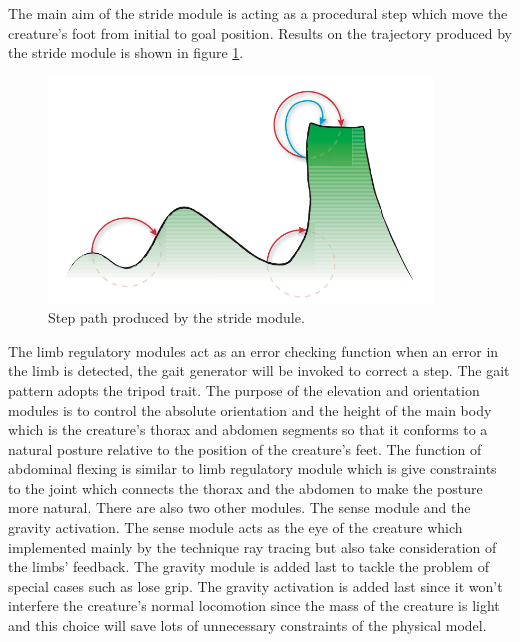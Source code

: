The main aim of the stride module is acting as a procedural step which move the creature's foot from initial to goal position. Results on the trajectory produced by the stride module is shown in figure \ref{fig:stride}.
\begin{figure}[ht!]
\centering
\includegraphics[height=6cm]{figures/stride.png}
\caption{Step path produced by the stride module. \protect\cite{thesis}}
\label{fig:stride}
\end{figure}
The limb regulatory modules act as an error checking function when an error in the limb is detected, the
gait generator will be invoked to correct a step. The gait pattern adopts the tripod trait. 
The purpose of the elevation and orientation modules is to control the absolute
orientation and the height of the main body which is the creature's
thorax and abdomen segments so that it conforms to a natural posture
relative to the position of the creature's feet. The function of abdominal flexing
is similar to limb regulatory module which is give constraints to the
joint which connects the thorax and the abdomen to make the posture
more natural. 
There are also two other modules. The sense module and the gravity activation.
The sense module acts as the eye of the creature which implemented mainly by the technique ray tracing but also take consideration of the limbs' feedback. The gravity module is added last to tackle the problem of special cases such as lose grip. The gravity activation is added last since it won't interfere the creature's normal locomotion since the mass of the creature is light and this choice will save lots of unnecessary constraints of the physical model\cite{thesis}.
